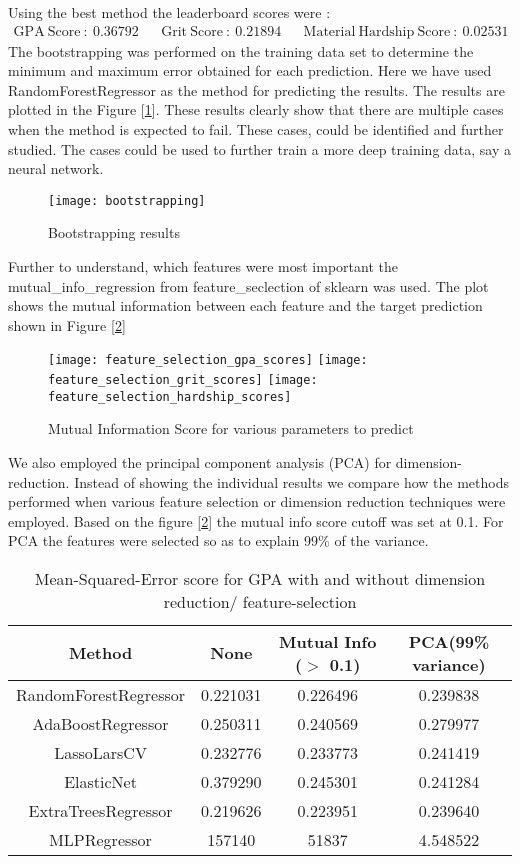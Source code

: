 Using the best method the leaderboard scores were :
\begin{align*}
\mathrm{GPA \ Score \ :} \ 0.36792  && \mathrm{Grit \ Score \ :} \ 0.21894  && \mathrm{Material \ Hardship \ Score \ :} \ 0.02531
\end{align*}
The bootstrapping was performed on the training data set to determine the minimum and maximum error obtained for each prediction. Here we have used RandomForestRegressor as the method for predicting the results. The results are plotted in the Figure [\ref{fig:bootstrapping}]. These results clearly show that there are multiple cases when the method is expected to fail. These cases, could be identified and further studied. The cases could be used to further train a more deep training data, say a neural network.\\
\begin{figure}[H]
\centering
\texttt{[image: bootstrapping]}
\caption{Bootstrapping results}
\label{fig:bootstrapping}
\end{figure}
Further to understand, which features were most important the {\ttfamily mutual\_info\_regression} from {\ttfamily feature\_seclection} of sklearn was used. The plot shows the mutual information between each feature and the target prediction shown in Figure [\ref{fig:mutual_info}]
\begin{figure}[H]
\centering
\texttt{[image: feature\_selection\_gpa\_scores]}
\texttt{[image: feature\_selection\_grit\_scores]}
\texttt{[image: feature\_selection\_hardship\_scores]}
\caption{Mutual Information Score for various parameters to predict}
\label{fig:mutual_info}
\end{figure}
We also employed the principal component analysis (PCA) for dimension-reduction. Instead of showing the individual results we compare how the methods performed when various feature selection or dimension reduction techniques were employed. Based on the figure [\ref{fig:mutual_info}] the mutual info score cutoff was set at 0.1. For PCA the features were selected so as to explain 99\% of the variance.
\begin{table}[H]
\centering
	\begin{tabular}{|c|c|c|c|}
	\hline
	Method & None & Mutual Info ($>$ 0.1) & PCA(99\% variance)\\
	\hline
	RandomForestRegressor	&	0.221031	&	0.226496	&	0.239838	\\
	AdaBoostRegressor		&	0.250311	&	0.240569	&	0.279977	\\
	LassoLarsCV				&	0.232776	&	0.233773	&	0.241419	\\
	ElasticNet				&	0.379290	&	0.245301	&	0.241284	\\
	ExtraTreesRegressor		&	0.219626	&	0.223951	&	0.239640	\\
	MLPRegressor			&	157140	&	51837	&	4.548522	\\
	\hline
	\end{tabular}
	\caption{Mean-Squared-Error score for GPA with and without dimension reduction/ feature-selection}
\end{table}
